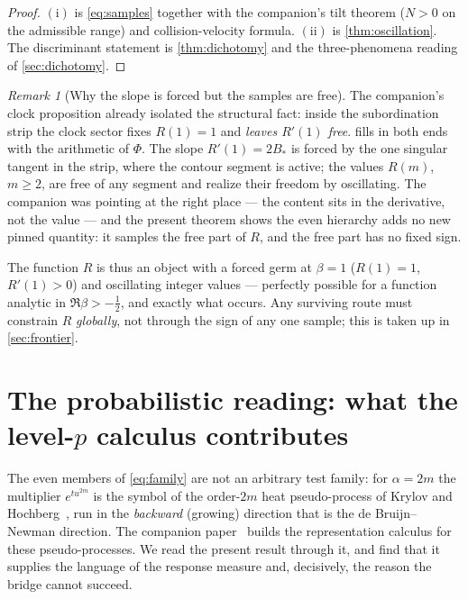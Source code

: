 \documentclass[11pt,reqno]{amsart}
\theoremstyle{plain}
\theoremstyle{definition}
\theoremstyle{remark}
\newtheorem{remark}[theorem]{Remark}
\begin{document}
\begin{proof}
$(\mathrm i)$ is \eqref{eq:samples} together with the companion's tilt
theorem ($N>0$ on the admissible range) and collision-velocity formula.
$(\mathrm{ii})$ is \cref{thm:oscillation}. The discriminant statement is
\cref{thm:dichotomy} and the three-phenomena reading of
\cref{sec:dichotomy}.
\end{proof}

\begin{remark}[Why the slope is forced but the samples are free]
\label{rem:freevalue}
The companion's clock proposition already isolated the structural fact:
inside the subordination strip the clock sector fixes $R(1)=1$ and
\emph{leaves $R'(1)$ free}.  fills in both ends with the
arithmetic of $\Phi$. The slope $R'(1)=2B_*$ is forced by the one singular
tangent in the strip, where the contour segment is active; the values
$R(m)$, $m\ge2$, are free of any segment and realize their freedom by
oscillating. The companion was pointing at the right place --- the content
sits in the derivative, not the value --- and the present theorem shows the
even hierarchy adds no new pinned quantity: it samples the free part of $R$,
and the free part has no fixed sign.
\end{remark}

The function $R$ is thus an object with a forced germ at $\beta=1$
($R(1)=1$, $R'(1)>0$) and oscillating integer values --- perfectly possible
for a function analytic in $\Re\beta>-\tfrac12$, and exactly what occurs.
Any surviving route must
constrain $R$ \emph{globally}, not through the sign of any one sample; this
is taken up in \cref{sec:frontier}.

\section{The probabilistic reading: what the level-$p$ calculus contributes}
\label{sec:probabilistic}

The even members of \eqref{eq:family} are not an arbitrary test family: for
$\alpha=2m$ the multiplier $e^{tu^{2m}}$ is the symbol of the order-$2m$
heat pseudo-process of Krylov and Hochberg~\cite{Krylov,Hochberg}, run in
the \emph{backward} (growing) direction that is the de Bruijn--Newman
direction. The companion paper~\cite{Fpseudo} builds the representation
calculus for these pseudo-processes. We read the present result through it,
and find that it supplies the language of the response measure and,
decisively, the reason the bridge cannot succeed.
\end{document}
